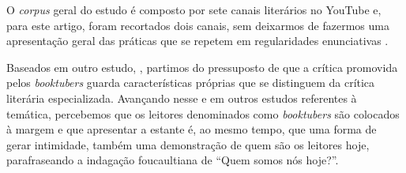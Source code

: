 O \textit{corpus} geral do estudo é composto por sete canais literários no
YouTube e, para este artigo, foram recortados dois canais, sem deixarmos
de fazermos uma apresentação geral das práticas que se repetem em
regularidades enunciativas \cite{foucault2009arqueologia}.

Baseados em outro estudo, \textcite{vizibeli_contrastes_2016}, partimos do pressuposto de que a crítica promovida pelos \textit{booktubers} guarda características próprias que se distinguem da crítica literária especializada. Avançando nesse e em outros estudos referentes à temática, percebemos que os leitores denominados como \textit{booktubers} são colocados à margem e que apresentar a estante é, ao mesmo tempo, que uma forma de gerar intimidade, também uma demonstração de quem são os leitores hoje, parafraseando a indagação foucaultiana de “Quem somos nós hoje?”.